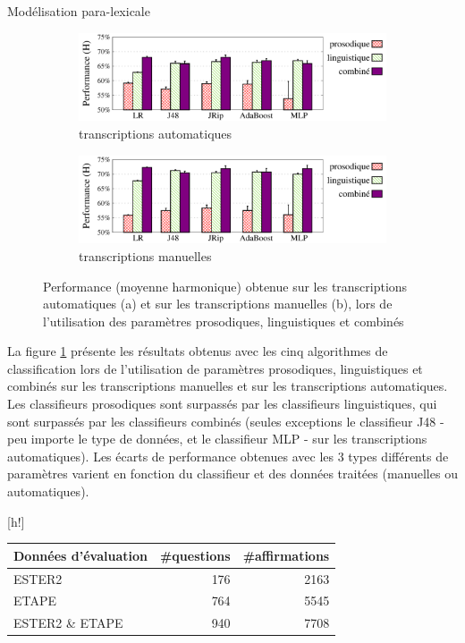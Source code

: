 \documentclass{style/these}
\makeatletter
\renewcommand\familydefault{ptm}
\renewenvironment{table}%
{ \renewcommand{\familydefault}{ptm}\selectfont
  \@float{table}}
  {\end@float}
\makeatother
\begin{document}
\begin{part}{Modélisation para-lexicale}
\begin{figure}[h!]
\begin{subfigure}{\textwidth}
\centering
\includegraphics[scale=0.58]{images/results/comparePLC_onAutomatic_legendPLC.pdf}
\caption{transcriptions automatiques}
\end{subfigure}
\begin{subfigure}{\textwidth}
\centering
\includegraphics[scale=0.58]{images/results/comparePLC_onManual_legendPLC.pdf}
\caption{transcriptions manuelles}
\end{subfigure}
\caption{Performance (moyenne harmonique) obtenue sur les transcriptions automatiques (a) et sur les transcriptions manuelles (b), lors de l'utilisation des paramètres prosodiques, linguistiques et combinés}
\label{Fig:QD-PLC-MD}
\end{figure}

La figure \ref{Fig:QD-PLC-MD} présente les résultats obtenus avec les cinq algorithmes de classification lors de l'utilisation de paramètres prosodiques, linguistiques et combinés sur les transcriptions manuelles et sur les transcriptions automatiques. 
Les classifieurs prosodiques sont surpassés par les classifieurs linguistiques, qui sont surpassés par les classifieurs combinés (seules exceptions le classifieur J48 - peu importe le type de données, et le classifieur MLP - sur les transcriptions automatiques). 
Les écarts de performance obtenues avec les 3 types différents de paramètres varient en fonction du classifieur et des données traitées (manuelles ou automatiques). 


\begin{table}[h!]
\centering
\begin{tabular}{|l|r|r|}
\hline
\textbf{Données d'évaluation} 	& \textbf{\#questions} & \textbf{\#affirmations} \\ \hline
ESTER2		 	& 176	& 2163		\\ 
ETAPE		 	& 764	& 5545		\\ \hline
ESTER2 \& ETAPE	 	& 940	& 7708		\\ \hline
\end{tabular}
\caption{Description des données d'évaluation par sous corpus}
\label{Tab:TestData-QD-perCorpus}
\end{table}



\end{part}
\end{document}
